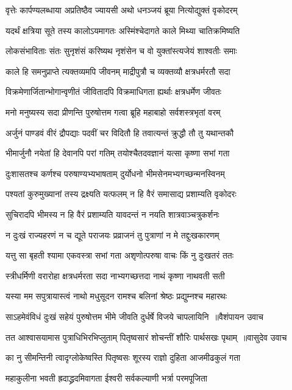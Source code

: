 \twolineshloka
{वृत्तेः कार्पण्यलब्धाया अप्रतिष्ठैव ज्यायसी}
{अथो धनञ्जयं ब्रूया नित्योद्युक्तं वृकोदरम्}


\twolineshloka
{यदर्थं क्षत्रिया सूते तस्य कालोऽयमागतः}
{अस्मिंश्चेदागते काले मिथ्या चातिक्रमिष्यति}


\twolineshloka
{लोकसंभाविताः संतः सुनृशंसं करिष्यथ}
{नृशंसेन च वो युक्तांस्त्यजेयं शाश्वतीः समाः}


\twolineshloka
{काले हि समनुप्राप्ते त्यक्तव्यमपि जीवनम्}
{माद्रीपुत्रौ च व्यक्तव्यौ क्षत्रधर्मरतौ सदा}


\twolineshloka
{विक्रमेणार्जितान्भोगान्वृणीतं जीवितादपि}
{विक्रमाधिगता ह्यर्थाः क्षत्रधर्मेण जीवतः}


\twolineshloka
{मनो मनुष्यस्य सदा प्रीणन्ति पुरुषोत्तम}
{गत्वा ब्रूहि महाबाहो सर्वशस्त्रभृतां वरम्}


\twolineshloka
{अर्जुनं पाण्डवं वीरं द्रौपद्याः पदवीं चर}
{विदितौ हि तवात्यन्तं क्रुद्धौ तौ तु यथान्तकौ}


\twolineshloka
{भीमार्जुनौ नयेतां हि देवानपि परां गतिम्}
{तयोश्चैतदवज्ञानं यत्सा कृष्णा सभां गता}


\twolineshloka
{दुःशासतश्च कर्णश्च परुषाण्यभ्यभाषताम्}
{दुर्योधनो भीमसेनमभ्यगच्छन्मनस्विनम्}


\twolineshloka
{पश्यतां कुरुमुख्यानां तस्य द्रक्ष्यति यत्फलम्}
{न हि वैरं समासाद्य प्रशाम्यति वृकोदरः}


\twolineshloka
{सुचिरादपि भीमस्य न हि वैरं प्रशाम्यति}
{यावदन्तं न नयति शात्रवाञ्चत्रुकर्शनः}


\twolineshloka
{न दुःखं राज्यहरणं न च द्यूते पराजयः}
{प्रव्राजनं तु पुत्राणां न मे तद्दुःखकारणम्}


\twolineshloka
{यत्तु सा बृहती श्यामा एकवस्त्रा सभां गता}
{अशृणोत्परुषा वाचः किं नु दुःखतरं ततः}


\twolineshloka
{स्त्रीधर्मिणी वरारोहा क्षत्रधर्मरता सदा}
{नाभ्यगच्छत्तदा नाथं कृष्णा नाथवती सती}


\twolineshloka
{यस्या मम सपुत्रायास्त्वं नाथो मधुसूदन}
{रामश्च बलिनां श्रेष्ठः प्रद्युम्नश्च महारथः}


\threelineshloka
{साऽहमेवंविधं दुःखं सहेयं पुरुषोत्तम}
{भीमे जीवति दुर्धर्षे विजये चापलायिनि ॥वैशंपायन उवाच}
{}


\threelineshloka
{तत आश्वासयामास पुत्राधिभिरभिप्लुताम्}
{पितृष्वसारं शोचन्तीं शौरिः पार्थसखः पृथाम् ॥वासुदेव उवाच}
{}


\twolineshloka
{का नु सीमन्तिनी त्वादृग्लोकेष्वस्ति पितृष्वसः}
{शूरस्य राज्ञो दुहिता आजमीढकुलं गता}


\twolineshloka
{महाकुलीना भवती ह्रदाद्ध्रदमिवागता}
{ईश्वरी सर्वकल्याणी भर्त्रा परमपूजिता}


